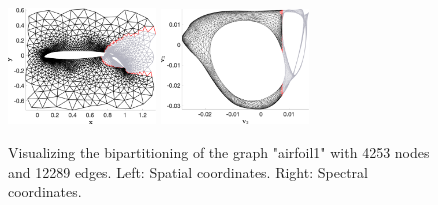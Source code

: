 \documentclass[unicode,11pt,a4paper,oneside,numbers=endperiod,openany]{scrartcl}
\begin{document}
\begin{figure}[!h]
\begin{center}
  \includegraphics[width=0.35\textwidth]{images/airfoil_part_spat.png}
  \includegraphics[width=0.35\textwidth]{images/airfoil_part_spec.png}
  \caption{Visualizing the bipartitioning of the graph "airfoil1" with 4253 nodes and 12289 edges. Left: Spatial coordinates. Right: Spectral coordinates.}
  \label{fig:spectral_layout}
\end{center}
\end{figure}


\end{document}
